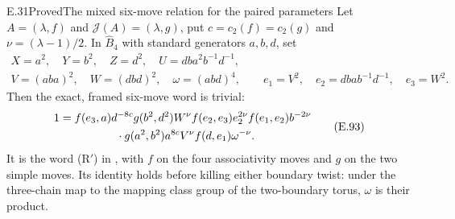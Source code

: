 \begin{result}{E.31}{Proved}{The mixed six-move relation for the paired parameters}
Let $A=(\lambda,f)$ and $\mathcal J(A)=(\lambda,g)$,
put $c=c_2(f)=c_2(g)$ and $\nu=(\lambda-1)/2$.
In $\widehat B_4$ with standard generators $a,b,d$, set
\[
 \begin{gathered}
 X=a^2,\quad Y=b^2,\quad Z=d^2,\quad
 U=db a^2b^{-1}d^{-1},\\
 V=(aba)^2,\quad W=(dbd)^2,\quad
 \omega=(abd)^4,\qquad
 e_1=V^2,\quad e_2=dba b^{-1}d^{-1},\quad e_3=W^2.
 \end{gathered}
\]
Then the exact, framed six-move word is trivial:
\[
\begin{split}
 1={}&f(e_3,a)d^{-8c}g(b^2,d^2)W^\nu
       f(e_2,e_3)e_2^{2\nu}f(e_1,e_2)b^{-2\nu}\\
    &\hspace{13mm}\cdot g(a^2,b^2)a^{8c}V^\nu
       f(d,e_1)\omega^{-\nu}.                         
\end{split}\tag{E.93}
\]
It is the word (R$'$) in
\cite[proof of Claim 8.3, (6AS), pp.~541--542]{ET_NS2000},
with $f$ on the four associativity moves and $g$ on
the two simple moves.  Its identity holds before
killing either boundary twist: under the three-chain
map to the mapping class group of the two-boundary
torus, $\omega$ is their product.
\end{result}
